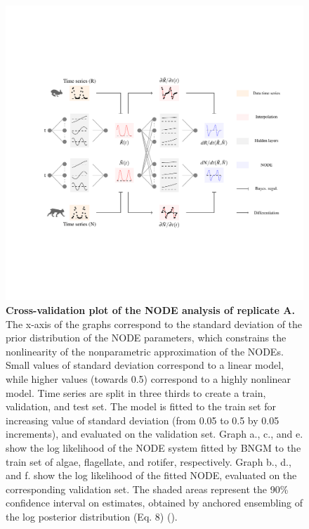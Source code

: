 \documentclass[11pt, oneside]{article}
\begin{document}
\newpage
\begin{figure}[H]
\includegraphics[width=1\linewidth,page=15]{figures/main.pdf}
\caption{
    \textbf{Cross-validation plot of the NODE analysis of replicate A.}
    The x-axis of the graphs correspond to the standard deviation of the prior distribution of the NODE parameters, which constrains the nonlinearity of the nonparametric approximation of the NODEs.
    Small values of standard deviation correspond to a linear model, while higher values (towards 0.5) correspond to a highly nonlinear model.
    Time series are split in three thirds to create a train, validation, and test set. 
    The model is fitted to the train set for increasing value of standard deviation (from 0.05 to 0.5 by 0.05 increments), and evaluated on the validation set.
    Graph a., c., and e. show the log likelihood of the NODE system fitted by BNGM to the train set of algae, flagellate, and rotifer, respectively.
    Graph b., d., and f. show the log likelihood of the fitted NODE, evaluated on the corresponding validation set.
    The shaded areas represent the 90\% confidence interval on estimates, obtained by anchored ensembling of the log posterior distribution (Eq. 8) (\cite{Pearce2018}).
}
\end{figure}
\newpage
\end{document}
